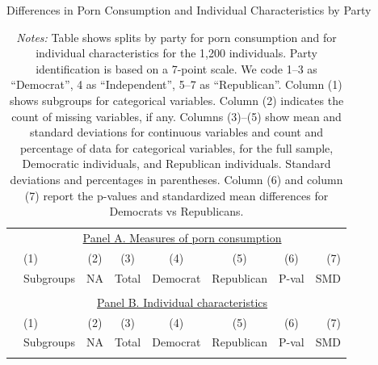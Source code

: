 \documentclass[12pt, letterpaper]{article}
\begin{document}
\begin{table}[ht] \centering \small \setlength\tabcolsep{5 pt}
	\caption{Differences in Porn Consumption and Individual Characteristics by Party}
	\label{tab:characteristics_split_by_party}
	\begin{adjustbox}{max width=\textwidth}
		\begin{tabular}{@{\hspace{0\tabcolsep}}llrcccrr@{\hspace{0\tabcolsep}}}
			\toprule
			&\multicolumn{7}{c}{\underline{Panel A. Measures of porn consumption}}\\
			&\multicolumn{1}{l}{(1)}&\multicolumn{1}{c}{(2)}&\multicolumn{1}{c}{(3)}&\multicolumn{1}{c}{(4)}&\multicolumn{1}{c}{(5)}&\multicolumn{1}{c}{(6)}&\multicolumn{1}{r}{(7)}\\			
			&\multicolumn{1}{l}{Subgroups}&\multicolumn{1}{c}{NA}&\multicolumn{1}{c}{Total}&\multicolumn{1}{c}{Democrat}&\multicolumn{1}{c}{Republican}&\multicolumn{1}{c}{P-val}&\multicolumn{1}{r}{SMD}\\
			\cmidrule{2-8}
			\\
			\cmidrule{2-8}
			&\multicolumn{7}{c}{\underline{Panel B. Individual characteristics}}\\
			&\multicolumn{1}{l}{(1)}&\multicolumn{1}{c}{(2)}&\multicolumn{1}{c}{(3)}&\multicolumn{1}{c}{(4)}&\multicolumn{1}{c}{(5)}&\multicolumn{1}{c}{(6)}&\multicolumn{1}{r}{(7)}\\			
			&\multicolumn{1}{l}{Subgroups}&\multicolumn{1}{c}{NA}&\multicolumn{1}{c}{Total}&\multicolumn{1}{c}{Democrat}&\multicolumn{1}{c}{Republican}&\multicolumn{1}{c}{P-val}&\multicolumn{1}{r}{SMD}\\
			\cmidrule{2-8}
			\\
			\bottomrule
		\end{tabular}
	\end{adjustbox}
	\caption*{\scriptsize \emph{Notes:}
		Table shows splits by party for porn consumption and for individual characteristics for the 1,200 individuals.
		Party identification is based on a 7-point scale. We code 1--3 as ``Democrat'', 4 as ``Independent'', 5--7 as ``Republican''.
		Column (1) shows subgroups for categorical variables.
		Column (2) indicates the count of missing variables, if any.
		Columns (3)--(5) show mean and standard deviations for continuous variables and count and percentage of data for categorical variables, for the full sample, Democratic individuals, and Republican individuals.
		Standard deviations and percentages in parentheses.
		Column (6) and column (7) report the p-values and standardized mean differences for Democrats vs Republicans.
	}
\end{table}
\end{document}
